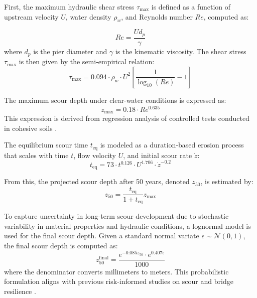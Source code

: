 \documentclass[authoryear,preprint,review,12pt]{elsarticle}
\begin{document}
First, the maximum hydraulic shear stress $\tau_{\text{max}}$ is defined as a function of upstream velocity $U$, water density $\rho_w$, and Reynolds number $Re$, computed as:

\begin{equation}
Re = \frac{U d_p}{\gamma}
\label{eq:reynolds}
\end{equation}
where $d_p$ is the pier diameter and $\gamma$ is the kinematic viscosity. The shear stress $\tau_{\text{max}}$ is then given by the semi-empirical relation:
\begin{equation}
\tau_{\text{max}} = 0.094 \cdot \rho_w \cdot U^2 \left[ \frac{1}{\log_{10}(Re)} - 1 \right]
\label{eq:shear}
\end{equation}

The maximum scour depth under clear-water conditions is expressed as:
\begin{equation}
z_{\text{max}} = 0.18 \cdot Re^{0.635}
\label{eq:zmax}
\end{equation}
This expression is derived from regression analysis of controlled tests conducted in cohesive soils \citep{Gudavalli1998}.

The equilibrium scour time $t_{\text{eq}}$ is modeled as a duration-based erosion process that scales with time $t$, flow velocity $U$, and initial scour rate $\dot{z}$:
\begin{equation}
t_{\text{eq}} = 73 \cdot t^{0.126} \cdot U^{1.706} \cdot \dot{z}^{-0.2}
\label{eq:teq}
\end{equation}

From this, the projected scour depth after 50 years, denoted $z_{50}$, is estimated by:
\begin{equation}
z_{50} = \frac{t_{\text{eq}}}{1 + t_{\text{eq}}} z_{\text{max}}
\label{eq:z50}
\end{equation}

To capture uncertainty in long-term scour development due to stochastic variability in material properties and hydraulic conditions, a lognormal model is used for the final scour depth. Given a standard normal variate $\epsilon \sim \mathcal{N}(0,1)$, the final scour depth is computed as:
\begin{equation}
z_{50}^{\text{final}} = \frac{e^{-0.085 z_{50}} \cdot e^{0.407 \epsilon}}{1000}
\label{eq:zfinal}
\end{equation}
where the denominator converts millimeters to meters. This probabilistic formulation aligns with previous risk-informed studies on scour and bridge resilience \citep{Alipour2013,Briaud2010}.
\end{document}
